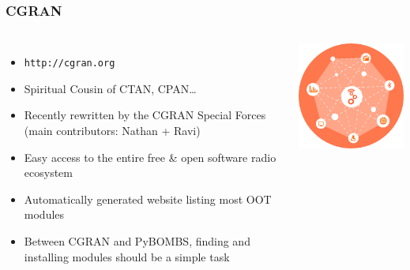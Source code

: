 \documentclass{beamer}
\begin{document}
\begin{frame}
  \frametitle{CGRAN}

  \begin{columns}[c]
    \column[T]{9cm}

  \begin{itemize}
    \item \texttt{http://cgran.org}
    \item Spiritual Cousin of CTAN, CPAN\ldots
    \item Recently rewritten by the CGRAN Special Forces (main contributors: Nathan + Ravi)
    \item Easy access to the entire free \& open software radio ecosystem
    \item Automatically generated website listing most OOT modules
    \item Between CGRAN and PyBOMBS, finding and installing modules should be a simple task
  \end{itemize}

    \column[T]{2cm}

  \includegraphics[width=\textwidth]{cgran_logo}

  \end{columns}

\end{frame}
\end{document}
